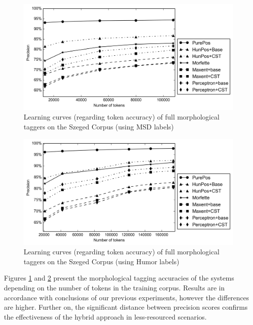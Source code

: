\begin{figure}[H]
  \centering
  \includegraphics[width=1\textwidth]{MorphTagging/msd_token.png} 
  \caption{Learning curves (regarding token accuracy) of full morphological taggers on the Szeged Corpus (using MSD labels)}
  \label{fig:msd-token}
\end{figure}

\begin{figure}[H]
  \centering
  \includegraphics[width=1\textwidth]{MorphTagging/humor_token.png}
  \caption{Learning curves (regarding token accuracy) of full morphological taggers on the Szeged Corpus (using Humor labels)}
  \label{fig:humor-token}
\end{figure}

Figures \ref{fig:msd-token} and \ref{fig:humor-token} present the morphological tagging accuracies of the systems depending on the number of tokens in the training corpus. 
Results are in accordance with conclusions of our previous experiments, however the differences are higher. 
Further on, the significant distance between precision scores confirms the effectiveness of the hybrid approach in less-resourced scenarios.

